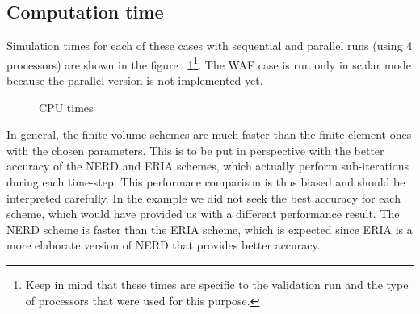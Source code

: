 \subsection{Computation time}

Simulation times for each of these cases with sequential and parallel runs (using 4 processors) are shown in the figure ~\ref{fig:thacker:cputime}\footnote{Keep in mind that these times
are specific to the validation run and the type of processors that were used for this purpose.}.
The WAF case is run only in scalar mode because the parallel version is not implemented yet.

\begin{figure}[h!]
  \centering
  \caption{CPU times}\label{fig:thacker:cputime}
\end{figure}

In general, the finite-volume schemes are much faster than the finite-element ones with the chosen parameters.
This is to be put in perspective with the better accuracy of the NERD and ERIA schemes, which actually perform sub-iterations during each time-step.
This performace comparison is thus biased and should be interpreted carefully. In the example we did not seek the best accuracy for each scheme,
which would have provided us with a different performance result.
The NERD scheme is faster than the ERIA scheme, which is expected since ERIA is a more elaborate version of NERD that provides better accuracy.


